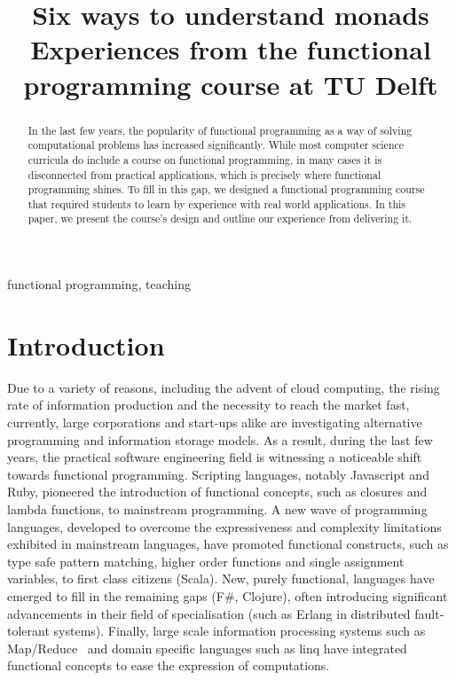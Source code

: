 \documentclass[conference]{IEEEtran}
\begin{document}
\title{Six ways to understand monads\\
\small{Experiences from the functional programming course at TU Delft}}

\author{
}
\maketitle

\begin{abstract}

  In the last few years, the popularity of functional programming as a way of
  solving computational problems has increased significantly. While most
  computer science curricula do include a course on functional programming, in
  many cases it is disconnected from practical applications, which is
  precisely where functional programming shines. To fill in this gap, we
  designed a functional programming course that  required students to
  learn by experience with real world applications. In this paper, we present
  the course's design and outline our experience from delivering it.

\end{abstract}

\begin{IEEEkeywords}
functional programming, teaching
\end{IEEEkeywords}

\section{Introduction}

Due to a variety of reasons, including the advent of cloud computing, the rising
rate of information production and the necessity to reach the market fast,
currently, large corporations and start-ups alike are investigating alternative
programming and information storage models. As a result, during the last few
years, the practical software engineering field is witnessing a noticeable shift
towards functional programming. Scripting languages, notably Javascript and
Ruby, pioneered the introduction of functional concepts, such as closures and
lambda functions, to mainstream programming. A new wave of programming
languages, developed to overcome the expressiveness and complexity limitations
exhibited in mainstream languages, have promoted functional constructs, such as
type safe pattern matching, higher order functions and single assignment
variables, to first class citizens (Scala).  New, purely functional, languages
have emerged to fill in the remaining gaps (F\#, Clojure), often introducing
significant advancements in their field of specialisation (such as Erlang in
distributed fault-tolerant systems).  Finally, large scale information
processing systems such as Map/Reduce~\cite{Dean04} and domain specific
languages such as {\sc linq} have integrated functional concepts to ease the
expression of computations.
\end{document}
